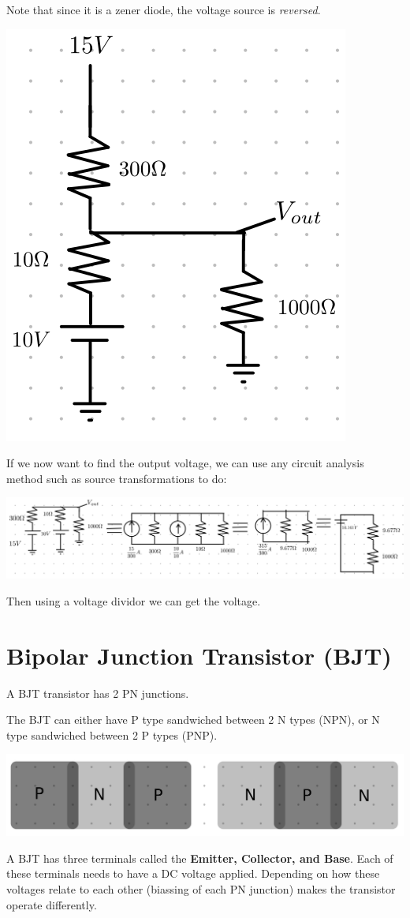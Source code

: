 \documentclass[12pt,letterpaper]{article} \usepackage{amsmath} \usepackage{graphicx} \usepackage[margin=1in]{geometry} \usepackage{longtable}  \usepackage{amssymb}
\begin{document}
\begin{mdframed}[]
		Note that since it is a zener diode, the voltage source is \textit{reversed}.
		\begin{center}
			\includegraphics[width=0.33\linewidth]{zener1}
		\end{center}
		If we now want to find the output voltage, we can use any circuit analysis method such as source transformations to do:
		\begin{center}
			\includegraphics[width=1\linewidth]{zener2}
		\end{center}
		Then using a voltage dividor we can get the voltage. 
	
	\end{mdframed}
	
	\section{Bipolar Junction Transistor (BJT)}
	A BJT transistor has 2 PN junctions. 
	
	The BJT can either have P type sandwiched between 2 N types (NPN), or N type sandwiched between 2 P types (PNP). 
	\begin{center}
		\includegraphics[width=0.7\linewidth]{pnp-vs-npn}
	\end{center}
	A BJT has three terminals called the \textbf{Emitter, Collector, and Base}. Each of these terminals needs to have a DC voltage applied. Depending on how these voltages relate to each other (biassing of each PN junction) makes the transistor operate differently. 
	
\end{document}
